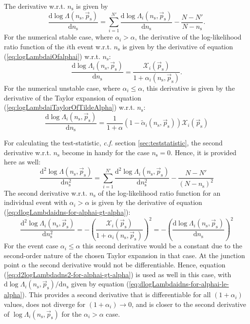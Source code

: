 \documentclass{article}
\newcommand{\ns}{n_{\mathrm{s}}}
\newcommand{\ps}{\vec{p}_{\mathrm{s}}}
\begin{document}
The derivative w.r.t. $\ns$ is given by
\begin{equation}
\frac{\mathrm{d} \log \Lambda(\ns,\ps)}{\mathrm{d} \ns} = \sum_{i=1}^{N'} \frac{\mathrm{d} \log \Lambda_i(\ns,\ps)}{\mathrm{d} \ns} - \frac{N - N'}{N - \ns}.
\end{equation}
For the numerical stable case, where $\alpha_i > \alpha$, the derivative of the
log-likelihood ratio function of the $i$th event w.r.t. $\ns$ is given by the
derivative of equation (\ref{eq:logLambdaiOfalphai}) w.r.t. $\ns$:
\begin{equation}
 \frac{\mathrm{d} \log \Lambda_i(\ns,\ps)}{\mathrm{d} \ns} = \frac{\mathcal{X}_i(\ps)}{1+\alpha_i(\ns,\ps)}.
 \label{eq:dlogLambdaidns-for-alphai-gt-alpha}
\end{equation}
For the numerical unstable case, where $\alpha_i \leq \alpha$, this derivative is
given by the derivative of the Taylor expansion of equation (\ref{eq:logLambdaiTaylorOfTildeAlpha})
w.r.t. $\ns$:
\begin{equation}
 \frac{\mathrm{d}\log\Lambda_i(\ns,\ps)}{\mathrm{d} \ns} = \frac{1}{1+\alpha}\left(1 - \tilde{\alpha}_i(\ns,\ps)\right) \mathcal{X}_i(\ps)
 \label{eq:dlogLambdaidns-for-alphai-le-alpha}
\end{equation}

For calculating the test-statistic, \emph{c.f.} section \ref{sec:teststatistic},
the second derivative w.r.t. $\ns$ become in handy for the case $\ns=0$. Hence,
it is provided here as well:
\begin{equation}
 \frac{\mathrm{d}^2\log\Lambda(\ns,\ps)}{\mathrm{d} \ns^2} = \sum_{i=1}^{N'} \frac{\mathrm{d}^2 \log \Lambda_i(\ns,\ps)}{\mathrm{d} \ns^2} - \frac{N-N'}{(N - \ns)^2}
\end{equation}
The second derivative w.r.t. $\ns$ of the log-likelihood ratio function for an
individual event with $\alpha_i > \alpha$ is given by the derivative of equation
(\ref{eq:dlogLambdaidns-for-alphai-gt-alpha}):
\begin{equation}
 \frac{\mathrm{d}^2\log\Lambda_i(\ns,\ps)}{\mathrm{d} \ns^2} = - \left(\frac{\mathcal{X}_i(\ps)}{1+\alpha_i(\ns,\ps)}\right)^2 = - \left( \frac{\mathrm{d} \log \Lambda_i(\ns,\ps)}{\mathrm{d} \ns} \right)^2
 \label{eq:d2logLambdadns2-for-alphai-gt-alpha}
\end{equation}
For the event case $\alpha_i \le \alpha$ this second derivative would be a
constant due to the second-order nature of the chosen Taylor expansion in that
case. At the junction point $\alpha$ the second derivative would not be differentiable.
Hence, equation (\ref{eq:d2logLambdadns2-for-alphai-gt-alpha}) is used as well
in this case, with $\mathrm{d}\log\Lambda_i(\ns,\ps)/\mathrm{d}\ns$ given by
equation (\ref{eq:dlogLambdaidns-for-alphai-le-alpha}). This provides a second
derivative that is differentiable for all $(1 + \alpha_i)$ values, does not
diverge for $(1 + \alpha_i) \rightarrow 0$, and is closer to the second
derivative of $\log\Lambda_i(\ns,\ps)$ for the $\alpha_i > \alpha$ case.
\end{document}
